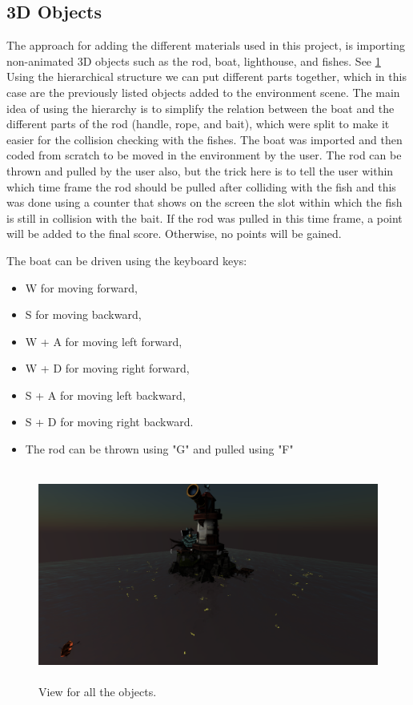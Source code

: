 \documentclass[paper=a4, fontsize=11pt]{scrartcl} %
\numberwithin{equation}{section} %
\numberwithin{figure}{section} %
\numberwithin{table}{section} %
\begin{document}
\subsection{3D Objects}

The approach for adding the different materials used in this project, is importing non-animated 3D objects such as the rod, boat, lighthouse, and fishes. See \ref{house} 
Using the hierarchical structure we can put different parts together, which in this case are the previously listed objects added to the environment scene. The main idea of using the hierarchy is to simplify the relation between the boat and the different parts of the rod (handle, rope, and bait), which were split to make it easier for the collision checking with the fishes. The boat was imported and then coded from scratch to be moved in the environment by the user. The rod can be thrown and pulled by the user also, but the trick here is to tell the user within which time frame the rod should be pulled after colliding with the fish and this was done using a counter that shows on the screen the slot within which the fish is still in collision with the bait. If the rod was pulled in this time frame, a point will be added to the final score. Otherwise, no points will be gained.\par
The boat can be driven using the keyboard keys:
\begin{itemize}
\item W for moving forward,
\item S for moving backward,
\item W + A for moving left forward,
\item W + D for moving right forward,
\item S + A for moving left backward,
\item S + D for moving right backward.
\item The rod can be thrown using "G" and pulled using "F" 
\end{itemize}


\begin{figure}[!ht]
\centering
\includegraphics[width=15cm, height=7cm]{lighthouse.png}
\caption{View for all the objects.}
\label{house}
\end{figure}
\newpage
\end{document}
